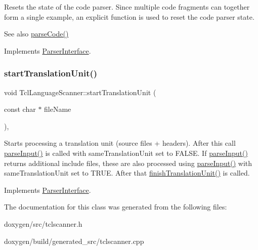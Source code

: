 Resets the state of the code parser. Since multiple code fragments can together form a single example, an explicit function is used to reset the code parser state. \begin{DoxySeeAlso}{See also}
\mbox{\hyperlink{class_tcl_language_scanner_a25f39e49124e2201c4a12d7ff1247b30}{parse\+Code()}} 
\end{DoxySeeAlso}


Implements \mbox{\hyperlink{class_parser_interface_aee4fccd1865a4e8a6b9f2896811104ca}{Parser\+Interface}}.

\mbox{\label{class_tcl_language_scanner_a60ddc698e1b483f71f4ce4ca4bffb512}} 
\subsubsection{\texorpdfstring{startTranslationUnit()}{startTranslationUnit()}}
{\footnotesize\ttfamily void Tcl\+Language\+Scanner\+::start\+Translation\+Unit (\begin{DoxyParamCaption}\item[{const char $\ast$}]{file\+Name }\end{DoxyParamCaption})\hspace{0.3cm}{\ttfamily [inline]}, {\ttfamily [virtual]}}

Starts processing a translation unit (source files + headers). After this call \mbox{\hyperlink{class_tcl_language_scanner_a0c1673d0753d4fa415de90aa7d875e0e}{parse\+Input()}} is called with same\+Translation\+Unit set to F\+A\+L\+SE. If \mbox{\hyperlink{class_tcl_language_scanner_a0c1673d0753d4fa415de90aa7d875e0e}{parse\+Input()}} returns additional include files, these are also processed using \mbox{\hyperlink{class_tcl_language_scanner_a0c1673d0753d4fa415de90aa7d875e0e}{parse\+Input()}} with same\+Translation\+Unit set to T\+R\+UE. After that \mbox{\hyperlink{class_tcl_language_scanner_a187804b0bf0a0043bad0f1a752224909}{finish\+Translation\+Unit()}} is called. 

Implements \mbox{\hyperlink{class_parser_interface_a72478f87ead5fde10d7d6bbe32a73024}{Parser\+Interface}}.



The documentation for this class was generated from the following files\+:\begin{DoxyCompactItemize}
\item 
doxygen/src/tclscanner.\+h\item 
doxygen/build/generated\+\_\+src/tclscanner.\+cpp\end{DoxyCompactItemize}
